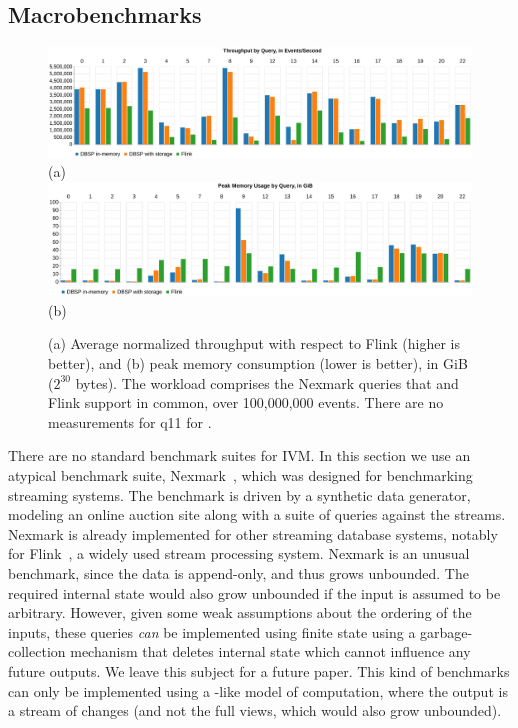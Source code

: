 \vspace{-3ex}
\subsection{Macrobenchmarks}\label{sec:macrobenchmarks}

\begin{figure}
  \includegraphics[width=.95\textwidth]{graph/throughput} \hspace{-3ex}
  (a) \\
  \includegraphics[width=.95\textwidth]{graph/memory} \hspace{-3ex}
  (b) \\
  \caption{(a) Average normalized throughput with respect to Flink
    (higher is better), and (b) peak memory consumption (lower is
    better), in GiB (\(2^{30}\) bytes).  The workload comprises the
    Nexmark queries that \dbsp and Flink support in common, over
    100,000,000 events.  There are no measurements for q11 for
    \dbsp.\label{fig:macrobenchmark}}
\end{figure}

There are no standard benchmark suites for IVM.  In this section we
use an atypical benchmark suite, Nexmark~\cite{tucker2008nexmark},
which was designed for benchmarking streaming systems.  The benchmark
is driven by a synthetic data generator, modeling an online
auction site along with a suite of queries against the streams.
Nexmark is already implemented for other streaming database systems,
notably for Flink~\cite{carbone-ieee15,nexmark-flink}, a widely used
stream processing system.  Nexmark is an unusual benchmark, since the
data is append-only, and thus grows unbounded.  The required internal
state would also grow unbounded if the input is assumed to be
arbitrary.  However, given some weak assumptions about the ordering of
the inputs, these queries \emph{can} be implemented using finite state
using a garbage-collection mechanism that deletes internal state which
cannot influence any future outputs.  We leave this subject for a
future paper.  This kind of benchmarks can only be implemented using a
\dbsp-like model of computation, where the output is a stream of
changes (and not the full views, which would also grow unbounded).

